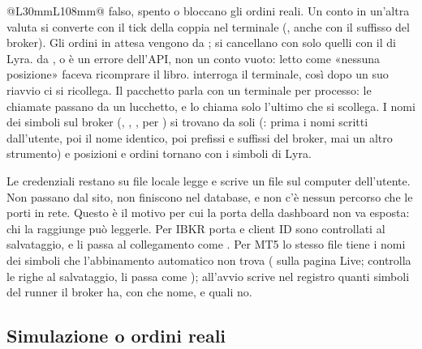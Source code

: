 \begin{center}
\begin{tabular}{@{}L{30mm}L{108mm}@{}}
  falso,  spento o  bloccano gli
  ordini reali. Un conto in un'altra valuta si converte con il tick della
  coppia nel terminale (, anche con il suffisso del broker).
  Gli ordini in attesa vengono da ; si cancellano
  con  solo quelli con il  di Lyra.
   da ,  o
   è un errore dell'API, non un conto vuoto: letto
  come «nessuna posizione» faceva ricomprare il libro.
   interroga il terminale, così dopo un suo
  riavvio ci si ricollega. Il pacchetto parla con un terminale per
  processo: le chiamate passano da un lucchetto, e  lo
  chiama solo l'ultimo che si scollega. I nomi dei simboli sul broker
  (, , ,  per
  ) si trovano da soli (: prima i nomi
  scritti dall'utente, poi il nome identico, poi prefissi e suffissi del
  broker, mai un altro strumento) e posizioni e ordini tornano con i simboli
  di Lyra. \\
\bottomrule
\end{tabular}
\end{center}

\begin{attenzione}{Le credenziali restano su file locale}
 legge e scrive un file sul computer
dell'utente. Non passano dal sito, non finiscono nel database, e non c'è
nessun percorso che le porti in rete. Questo è il motivo per cui la porta
della dashboard non va esposta: chi la raggiunge può leggerle. Per IBKR
porta e client ID sono controllati al salvataggio, e
 li passa al collegamento come
. Per MT5 lo stesso file tiene i nomi dei simboli che
l'abbinamento automatico non trova ( sulla
pagina Live;  controlla le righe al
salvataggio,  li passa come ); all'avvio
 scrive nel registro quanti simboli del
runner il broker ha, con che nome, e quali no.
\end{attenzione}

\subsection{Simulazione o ordini reali}\label{sez:live-ordini-reali}

